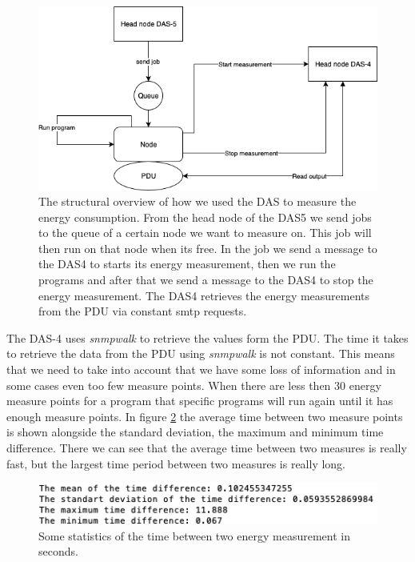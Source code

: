 \begin{figure}[h]
    \centering
    \includegraphics[width=.6\textwidth]{graphs/das.png}
    \caption{The structural overview of how we used the DAS to measure the energy consumption. From the head node of the DAS5 we send jobs to the queue of a certain node we want to measure on. This job will then run on that node when its free. In the job we send a message to the DAS4 to starts its energy measurement, then we run the programs and after that we send a message to the DAS4 to stop the energy measurement. The DAS4 retrieves the energy measurements from the PDU via constant smtp requests.}
    \label{fig:overview}
\end{figure}

The DAS-4 uses \textit{snmpwalk} to retrieve the values form the PDU. The time it takes to retrieve the data from the PDU using \textit{snmpwalk} is not constant. This means that we need to take into account that we have some loss of information and in some cases even too few measure points. When there are less then 30 energy measure points for a program that specific programs will run again until it has enough measure points. In figure \ref{fig:time_diff} the average time between two measure points is shown alongside the standard deviation, the maximum and minimum time difference. There we can see that the average time between two measures is really fast, but the largest time period between two measures is really long. 

\begin{figure}[h]
    \centering
    \includegraphics[width=.6\textwidth]{graphs/time_between_measures.png}
    \caption{Some statistics of the time between two energy measurement in seconds.}
    \label{fig:time_diff}
\end{figure}

